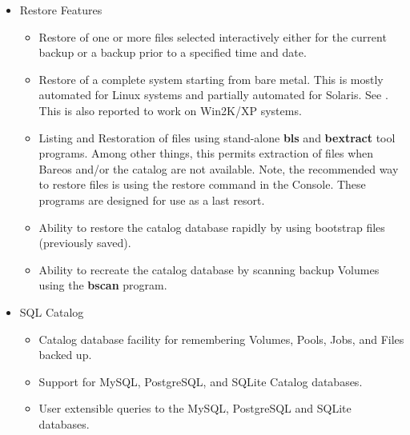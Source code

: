 \begin{itemize}
\item Restore Features
   \begin{itemize}
   \item Restore of one or more files selected interactively either for the
      current backup or a backup prior to a specified time and date.
   \item Restore of a complete system starting from bare  metal. This is mostly
      automated for Linux systems and  partially automated for Solaris. See
      . This is also
      reported to work on Win2K/XP systems.
   \item Listing and Restoration of files using stand-alone {\bf bls} and {\bf
        bextract} tool programs. Among other things, this permits extraction of
      files when Bareos and/or the catalog are not available. Note, the
      recommended way to restore files is using the restore command in the
      Console. These programs are designed for use as a last resort.
   \item Ability to restore the catalog database rapidly by using bootstrap
      files (previously saved).
   \item Ability to recreate the catalog database by scanning backup Volumes
      using the {\bf bscan} program.
   \end{itemize}

\item SQL Catalog
   \begin{itemize}
   \item Catalog database facility for remembering Volumes, Pools, Jobs,  and
      Files backed up.
   \item Support for MySQL, PostgreSQL, and SQLite Catalog databases.
   \item User extensible queries to the MySQL, PostgreSQL and SQLite databases.
   \end{itemize}


\end{itemize}
